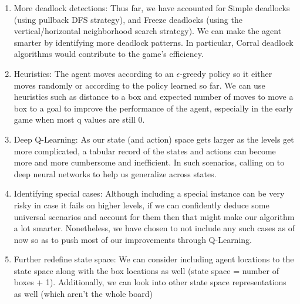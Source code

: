\documentclass{article}
\begin{document}
\begin{enumerate}
    \item More deadlock detections: Thus far, we have accounted for Simple deadlocks (using pullback DFS strategy), and Freeze deadlocks (using the vertical/horizontal neighborhood search strategy). We can make the agent smarter by identifying more deadlock patterns. In particular, Corral deadlock algorithms would contribute to the game's efficiency.
    \item Heuristics: The agent moves according to an $\epsilon$-greedy policy so it either moves randomly or according to the policy learned so far. We can use heuristics such as distance to a box and expected number of moves to move a box to a goal to improve the performance of the agent, especially in the early game when most q values are still $0$. 
    \item Deep Q-Learning: As our state (and action) space gets larger as the levels get more complicated, a tabular record of the states and actions can become more and more cumbersome and inefficient. In such scenarios, calling on to deep neural networks to help us generalize across states.
    \item Identifying special cases: Although including a special instance can be very risky in case it fails on higher levels, if we can confidently deduce some universal scenarios and account for them then that might make our algorithm a lot smarter. Nonetheless, we have chosen to not include any such cases as of now so as to push most of our improvements through Q-Learning. 
    \item Further redefine state space: We can consider including agent locations to the state space along with the box locations as well (state space = number of boxes + 1). Additionally, we can look into other state space representations as well (which aren't the whole board)   
\end{enumerate}
\end{document}
